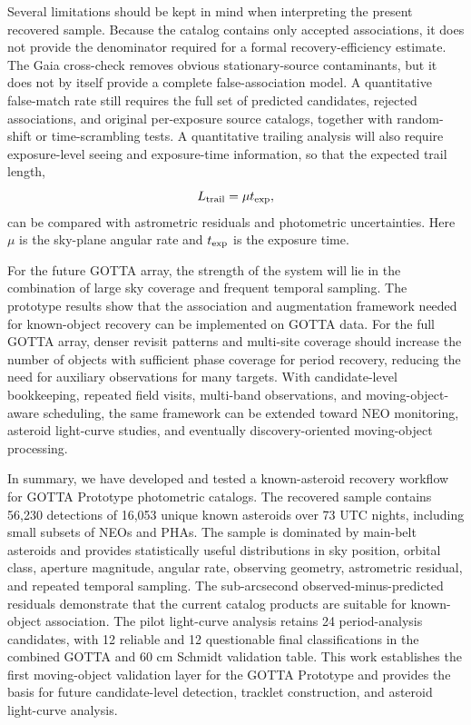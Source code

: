 \documentclass[referee]{raa}
\begin{document}
Several limitations should be kept in mind when interpreting the present recovered sample. Because the catalog contains only accepted associations, it does not provide the denominator required for a formal recovery-efficiency estimate. The Gaia cross-check removes obvious stationary-source contaminants, but it does not by itself provide a complete false-association model. A quantitative false-match rate still requires the full set of predicted candidates, rejected associations, and original per-exposure source catalogs, together with random-shift or time-scrambling tests. A quantitative trailing analysis will also require exposure-level seeing and exposure-time information, so that the expected trail length,
\begin{equation}
L_{\rm trail}=\mu t_{\rm exp},
\end{equation}
can be compared with astrometric residuals and photometric uncertainties. Here $\mu$ is the sky-plane angular rate and $t_{\rm exp}$ is the exposure time.

For the future GOTTA array, the strength of the system will lie in the combination of large sky coverage and frequent temporal sampling. The prototype results show that the association and augmentation framework needed for known-object recovery can be implemented on GOTTA data. For the full GOTTA array, denser revisit patterns and multi-site coverage should increase the number of objects with sufficient phase coverage for period recovery, reducing the need for auxiliary observations for many targets. With candidate-level bookkeeping, repeated field visits, multi-band observations, and moving-object-aware scheduling, the same framework can be extended toward NEO monitoring, asteroid light-curve studies, and eventually discovery-oriented moving-object processing.

In summary, we have developed and tested a known-asteroid recovery workflow for GOTTA Prototype photometric catalogs. The recovered sample contains 56,230 detections of 16,053 unique known asteroids over 73 UTC nights, including small subsets of NEOs and PHAs. The sample is dominated by main-belt asteroids and provides statistically useful distributions in sky position, orbital class, aperture magnitude, angular rate, observing geometry, astrometric residual, and repeated temporal sampling. The sub-arcsecond observed-minus-predicted residuals demonstrate that the current catalog products are suitable for known-object association. The pilot light-curve analysis retains 24 period-analysis candidates, with 12 reliable and 12 questionable final classifications in the combined GOTTA and 60 cm Schmidt validation table. This work establishes the first moving-object validation layer for the GOTTA Prototype and provides the basis for future candidate-level detection, tracklet construction, and asteroid light-curve analysis.
\end{document}
